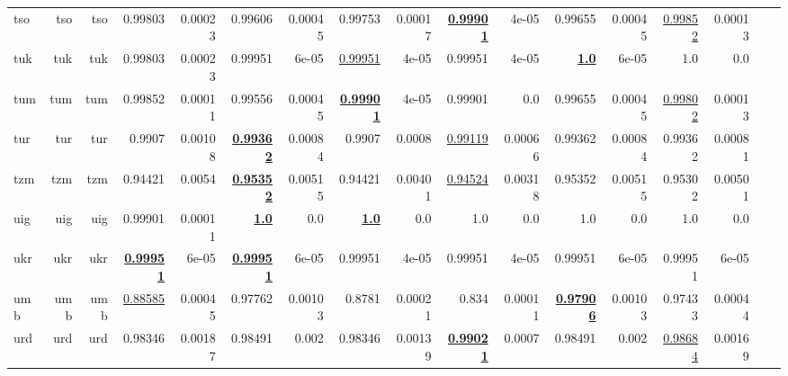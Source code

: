 \documentclass[11pt]{article}
\begin{document}
\begin{table*}[h]
{\begin{tabular}{lrrrrrrrrrrrrrrrr}
tso         & tso         & tso         & 0.99803         & 0.00023         & 0.99606         & 0.00045         & 0.99753         & 0.00017         & \textbf{\underline{0.99901}}         & 4e-05         & 0.99655         & 0.00045         & \underline{0.99852}         & 0.00013         \\
tuk         & tuk         & tuk         & 0.99803         & 0.00023         & 0.99951         & 6e-05         & \underline{0.99951}         & 4e-05         & 0.99951         & 4e-05         & \textbf{\underline{1.0}}         & 6e-05         & 1.0         & 0.0         \\
tum         & tum         & tum         & 0.99852         & 0.00011         & 0.99556         & 0.00045         & \textbf{\underline{0.99901}}         & 4e-05         & 0.99901         & 0.0         & 0.99655         & 0.00045         & \underline{0.99802}         & 0.00013         \\
tur         & tur         & tur         & 0.9907         & 0.00108         & \textbf{\underline{0.99362}}         & 0.00084         & 0.9907         & 0.0008         & \underline{0.99119}         & 0.00066         & 0.99362         & 0.00084         & 0.99362         & 0.00081         \\
tzm         & tzm         & tzm         & 0.94421         & 0.0054         & \textbf{\underline{0.95352}}         & 0.00515         & 0.94421         & 0.00401         & \underline{0.94524}         & 0.00318         & 0.95352         & 0.00515         & 0.95302         & 0.00501         \\
uig         & uig         & uig         & 0.99901         & 0.00011         & \textbf{\underline{1.0}}         & 0.0         & \textbf{\underline{1.0}}         & 0.0         & 1.0         & 0.0         & 1.0         & 0.0         & 1.0         & 0.0         \\
ukr         & ukr         & ukr         & \textbf{\underline{0.99951}}         & 6e-05         & \textbf{\underline{0.99951}}         & 6e-05         & 0.99951         & 4e-05         & 0.99951         & 4e-05         & 0.99951         & 6e-05         & 0.99951         & 6e-05         \\
umb         & umb         & umb         & \underline{0.88585}         & 0.00045         & 0.97762         & 0.00103         & 0.8781         & 0.00021         & 0.834         & 0.00011         & \textbf{\underline{0.97906}}         & 0.00103         & 0.97433         & 0.00044         \\
urd         & urd         & urd         & 0.98346         & 0.00187         & 0.98491         & 0.002         & 0.98346         & 0.00139         & \textbf{\underline{0.99021}}         & 0.0007         & 0.98491         & 0.002         & \underline{0.98684}         & 0.00169         \\

\end{tabular}}
\end{table*}
\end{document}
